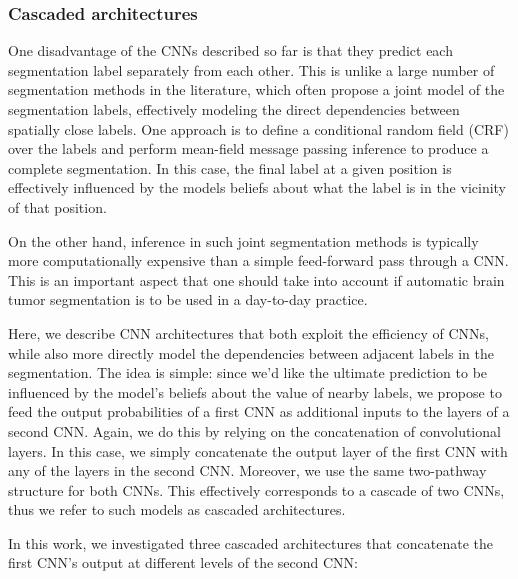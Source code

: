 \documentclass[final,5p,times,twocolumn]{elsarticle}
\begin{document}
\subsubsection{Cascaded architectures}
\label{sec::cascade}

One disadvantage of the CNNs described so far is that they predict each segmentation label separately from each other. This is unlike a large number of segmentation methods in the literature, which often propose a joint model of the segmentation labels, effectively modeling the direct dependencies between spatially close labels. One approach is to define a conditional random field (CRF) over the labels and perform mean-field message passing inference to produce a complete segmentation. In this case, the final label at a given position is effectively influenced by the models beliefs about what the label is in the vicinity of that position. 

On the other hand, inference in such joint segmentation methods is typically more computationally expensive than a simple feed-forward pass through a CNN. This is an important aspect that one should take into account if automatic brain tumor segmentation is to be used in a day-to-day practice.

Here, we describe CNN architectures that both exploit the efficiency of CNNs, while also more directly model the dependencies between adjacent labels in the segmentation. The idea is simple: since we'd like the ultimate prediction to be influenced by the model's beliefs about the value of nearby labels, we propose to feed the output probabilities of a first CNN as additional inputs to the layers of a second CNN. Again, we do this by relying on the concatenation of convolutional layers. In this case, we simply concatenate the output layer of the first CNN with any of the layers in the second CNN. Moreover, we use the same two-pathway structure for both CNNs. This effectively corresponds to a cascade of two CNNs, thus we refer to such models as cascaded architectures.

In this work, we investigated three cascaded architectures that concatenate the first CNN's output at different levels of the second CNN:
\end{document}
